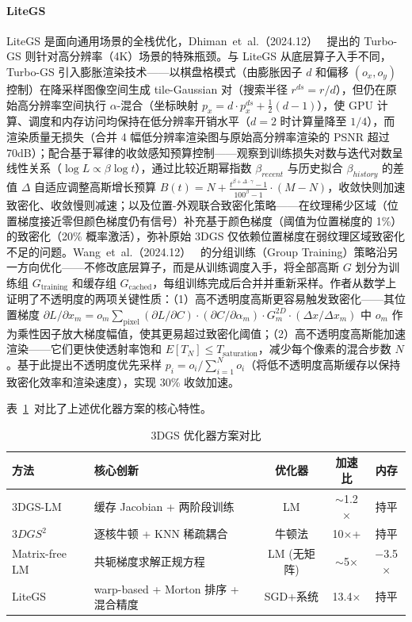 \paragraph{LiteGS}
LiteGS 是面向通用场景的全栈优化，Dhiman~et~al.（2024.12）~\cite{2412_13547} 提出的 Turbo-GS 则针对高分辨率（4K）场景的特殊瓶颈。与 LiteGS 从底层算子入手不同，Turbo-GS 引入膨胀渲染技术——以棋盘格模式（由膨胀因子 $d$ 和偏移 $(o_x, o_y)$ 控制）在降采样图像空间生成 tile-Gaussian 对（搜索半径 $r^{ds} = r/d$），但仍在原始高分辨率空间执行 $\alpha$-混合（坐标映射 $p_x = d \cdot p_x^{ds} + \frac{1}{2}(d-1)$），使 GPU 计算、调度和内存访问均保持在低分辨率开销水平（$d=2$ 时计算量降至 $1/4$），而渲染质量无损失（合并 4 幅低分辨率渲染图与原始高分辨率渲染的 PSNR 超过 70dB）；配合基于幂律的收敛感知预算控制——观察到训练损失对数与迭代对数呈线性关系（$\log L \propto \beta \log t$），通过比较近期幂指数 $\beta_{recent}$ 与历史拟合 $\beta_{history}$ 的差值 $\Delta$ 自适应调整高斯增长预算 $B(t) = N + \frac{t^{\beta+\Delta \cdot \gamma} - 1}{100^{\beta} - 1} \cdot (M - N)$，收敛快则加速致密化、收敛慢则减速；以及位置-外观联合致密化策略——在纹理稀少区域（位置梯度接近零但颜色梯度仍有信号）补充基于颜色梯度（阈值为位置梯度的 1\%）的致密化（20\% 概率激活），弥补原始 3DGS 仅依赖位置梯度在弱纹理区域致密化不足的问题。Wang~et~al.（2024.12）~\cite{2412_07608} 的分组训练（Group Training）策略沿另一方向优化——不修改底层算子，而是从训练调度入手，将全部高斯 $G$ 划分为训练组 $G_{\text{training}}$ 和缓存组 $G_{\text{cached}}$，每组训练完成后合并并重新采样。作者从数学上证明了不透明度的两项关键性质：（1）高不透明度高斯更容易触发致密化——其位置梯度 $\partial L / \partial x_m = o_m \sum_{\text{pixel}} (\partial L / \partial C) \cdot (\partial C / \partial \alpha_m) \cdot G_m^{2D} \cdot (\Delta x / \Delta x_m)$ 中 $o_m$ 作为乘性因子放大梯度幅值，使其更易超过致密化阈值；（2）高不透明度高斯能加速渲染——它们更快使透射率饱和 $E[T_N] \leq T_{\text{saturation}}$，减少每个像素的混合步数 $N$。基于此提出不透明度优先采样 $p_i = o_i / \sum_{i=1}^{N} o_i$（将低不透明度高斯缓存以保持致密化效率和渲染速度），实现 30\% 收敛加速。

表~\ref{tab:02_optimizers}~对比了上述优化器方案的核心特性。

\begin{table}[htbp]
\centering
\small
\caption{3DGS 优化器方案对比}
\label{tab:02_optimizers}
\begin{tabular}{l p{4.8cm} c c c}
\toprule
\textbf{方法} & \textbf{核心创新} & \textbf{优化器} & \textbf{加速比} & \textbf{内存} \\
\midrule
3DGS-LM~\cite{2409_12892} & 缓存 Jacobian + 两阶段训练 & LM & $\sim$1.2$\times$ & 持平 \\
$3DGS^2$~\cite{2501_13975} & 逐核牛顿 + KNN 稀疏耦合 & 牛顿法 & 10$\times$+ & 持平 \\
Matrix-free LM~\cite{2504_12905} & 共轭梯度求解正规方程 & LM (无矩阵) & $\sim$5$\times$ & $-$3.5$\times$ \\
LiteGS~\cite{2503_01199} & warp-based + Morton 排序 + 混合精度 & SGD+系统 & 13.4$\times$ & 持平 \\
\bottomrule
\end{tabular}
\end{table}

